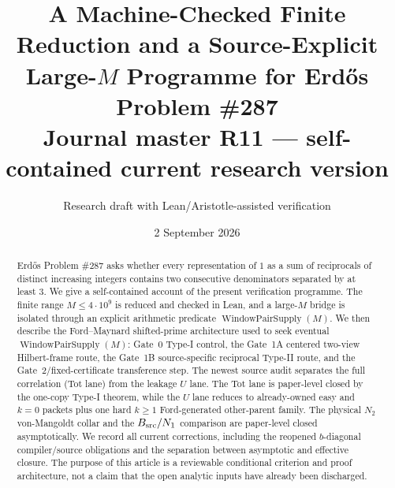 \documentclass[11pt]{article}
\title{\textbf{A Machine-Checked Finite Reduction and a Source-Explicit Large-$M$ Programme for Erd\H{o}s Problem \#287}\\[0.6ex]
\large Journal master R11 --- self-contained current research version}
\author{Research draft with Lean/Aristotle-assisted verification}
\date{2 September 2026}
\theoremstyle{definition}
\newcommand{\1}{\mathbf 1}
\newcommand{\WPS}{\operatorname{WindowPairSupply}}
\begin{document}
\maketitle

\begin{center}
\end{center}

\begin{abstract}
Erd\H{o}s Problem \#287 asks whether every representation of $1$ as a sum of reciprocals of distinct increasing integers contains two consecutive denominators separated by at least $3$. We give a self-contained account of the present verification programme. The finite range $M\le 4\cdot10^9$ is reduced and checked in Lean, and a large-$M$ bridge is isolated through an explicit arithmetic predicate $\WPS(M)$. We then describe the Ford--Maynard shifted-prime architecture used to seek eventual $\WPS(M)$: Gate~0 Type-I control, the Gate~1A centered two-view Hilbert-frame route, the Gate~1B source-specific reciprocal Type-II route, and the Gate~2/fixed-certificate transference step. The newest source audit separates the full correlation (Tot lane) from the leakage $U$ lane. The Tot lane is paper-level closed by the one-copy Type-I theorem, while the $U$ lane reduces to already-owned easy and $k=0$ packets plus one hard $k\ge1$ Ford-generated other-parent family. The physical $N_2$ von-Mangoldt collar and the $B_{\rm src}/N_1$ comparison are paper-level closed asymptotically. We record all current corrections, including the reopened $b$-diagonal compiler/source obligations and the separation between asymptotic and effective closure. The purpose of this article is a reviewable conditional criterion and proof architecture, not a claim that the open analytic inputs have already been discharged.
\end{abstract}
\end{document}
